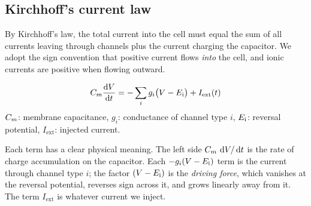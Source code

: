 \begin{center}

\end{center}

\subsection{Kirchhoff's current law}

By Kirchhoff's law, the total current into the cell must equal the sum of all currents leaving through channels plus the current charging the capacitor. We adopt the sign convention that positive current flows \emph{into} the cell, and ionic currents are positive when flowing outward.

\begin{keyequation}
\begin{equation}
  C_m\frac{\mathop{}\!\mathrm{d} V}{\mathop{}\!\mathrm{d} t} = -\sum_i g_i\bigl(V - E_{\mathrm{i}}\bigr) + I_{\text{ext}}(t)
  \label{eq:membrane}
\end{equation}
\tcblower
$C_m$: membrane capacitance, \quad
$g_i$: conductance of channel type $i$, \quad
$E_{\mathrm{i}}$: reversal potential, \quad
$I_{\text{ext}}$: injected current.
\end{keyequation}

Each term has a clear physical meaning. The left side $C_m\,\mathop{}\!\mathrm{d} V/\mathop{}\!\mathrm{d} t$ is the rate of charge accumulation on the capacitor. Each $-g_i(V - E_{\mathrm{i}})$ term is the current through channel type $i$; the factor $(V - E_{\mathrm{i}})$ is the \emph{driving force}, which vanishes at the reversal potential, reverses sign across it, and grows linearly away from it. The term $I_{\text{ext}}$ is whatever current we inject.

